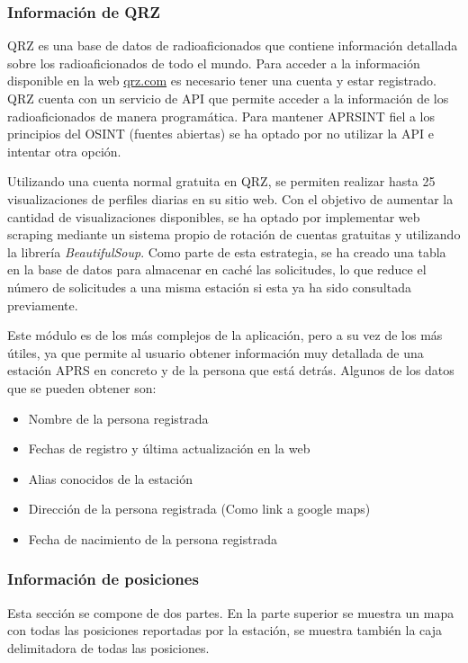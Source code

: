 \subsubsection{Información de QRZ}
QRZ es una base de datos de radioaficionados que contiene información detallada sobre los radioaficionados de todo el mundo. Para acceder a la información disponible en la web \url{qrz.com} es necesario tener una cuenta y estar registrado. QRZ cuenta con un servicio de API que permite acceder a la información de los radioaficionados de manera programática. Para mantener APRSINT fiel a los principios del OSINT (fuentes abiertas) se ha optado por no utilizar la API e intentar otra opción.

Utilizando una cuenta normal gratuita en QRZ, se permiten realizar hasta 25 visualizaciones de perfiles diarias en su sitio web. Con el objetivo de aumentar la cantidad de visualizaciones disponibles, se ha optado por implementar web scraping mediante un sistema propio de rotación de cuentas gratuitas y utilizando la librería \textit{BeautifulSoup}. Como parte de esta estrategia, se ha creado una tabla en la base de datos para almacenar en caché las solicitudes, lo que reduce el número de solicitudes a una misma estación si esta ya ha sido consultada previamente.

Este módulo es de los más complejos de la aplicación, pero a su vez de los más útiles, ya que permite al usuario obtener información muy detallada de una estación APRS en concreto y de la persona que está detrás. Algunos de los datos que se pueden obtener son:

\begin{itemize}
	\item Nombre de la persona registrada
	\item Fechas de registro y última actualización en la web
	\item Alias conocidos de la estación
	\item Dirección de la persona registrada (Como link a google maps)
	\item Fecha de nacimiento de la persona registrada
\end{itemize}

\subsubsection{Información de posiciones}
Esta sección se compone de dos partes. En la parte superior se muestra un mapa con todas las posiciones reportadas por la estación, se muestra también la caja delimitadora de todas las posiciones. 

